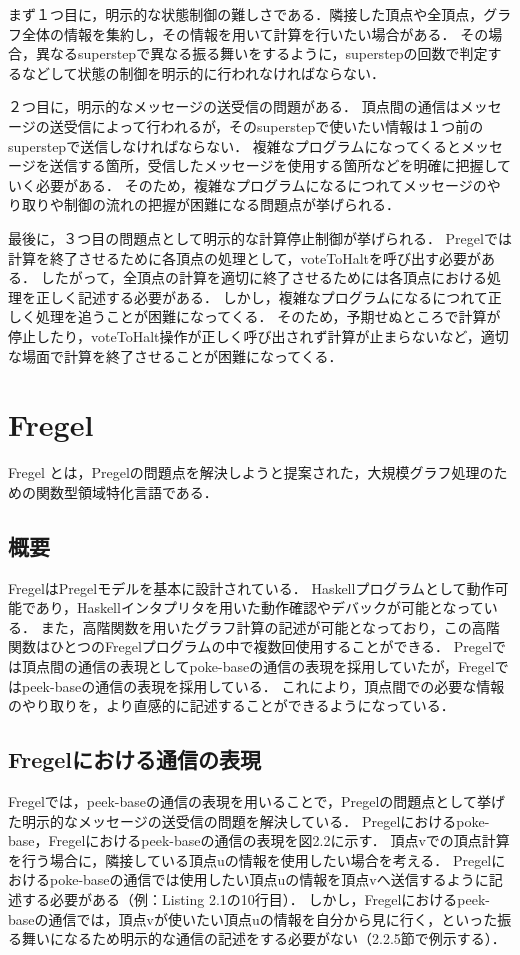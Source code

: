 \documentclass[12pt]{ujreport}
\begin{document}
まず１つ目に，明示的な状態制御の難しさである．隣接した頂点や全頂点，グラフ全体の情報を集約し，その情報を用いて計算を行いたい場合がある．
その場合，異なるsuperstepで異なる振る舞いをするように，superstepの回数で判定するなどして状態の制御を明示的に行われなければならない．

２つ目に，明示的なメッセージの送受信の問題がある．
頂点間の通信はメッセージの送受信によって行われるが，そのsuperstepで使いたい情報は１つ前のsuperstepで送信しなければならない．
複雑なプログラムになってくるとメッセージを送信する箇所，受信したメッセージを使用する箇所などを明確に把握していく必要がある．
そのため，複雑なプログラムになるにつれてメッセージのやり取りや制御の流れの把握が困難になる問題点が挙げられる．

最後に，３つ目の問題点として明示的な計算停止制御が挙げられる．
Pregelでは計算を終了させるために各頂点の処理として，voteToHaltを呼び出す必要がある．
したがって，全頂点の計算を適切に終了させるためには各頂点における処理を正しく記述する必要がある．
しかし，複雑なプログラムになるにつれて正しく処理を追うことが困難になってくる．
そのため，予期せぬところで計算が停止したり，voteToHalt操作が正しく呼び出されず計算が止まらないなど，適切な場面で計算を終了させることが困難になってくる．

\section{Fregel}
Fregel \cite{fregel}とは，Pregelの問題点を解決しようと提案された，大規模グラフ処理のための関数型領域特化言語である．

\subsection{概要}
FregelはPregelモデルを基本に設計されている．
Haskellプログラムとして動作可能であり，Haskellインタプリタを用いた動作確認やデバックが可能となっている．
また，高階関数を用いたグラフ計算の記述が可能となっており，この高階関数はひとつのFregelプログラムの中で複数回使用することができる．
Pregelでは頂点間の通信の表現としてpoke-baseの通信の表現を採用していたが，Fregelではpeek-baseの通信の表現を採用している．
これにより，頂点間での必要な情報のやり取りを，より直感的に記述することができるようになっている．

\subsection{Fregelにおける通信の表現}
Fregelでは，peek-baseの通信の表現を用いることで，Pregelの問題点として挙げた明示的なメッセージの送受信の問題を解決している．
Pregelにおけるpoke-base，Fregelにおけるpeek-baseの通信の表現を図2.2に示す．
頂点vでの頂点計算を行う場合に，隣接している頂点uの情報を使用したい場合を考える．
Pregelにおけるpoke-baseの通信では使用したい頂点uの情報を頂点vへ送信するように記述する必要がある（例：Listing 2.1の10行目）．
しかし，Fregelにおけるpeek-baseの通信では，頂点vが使いたい頂点uの情報を自分から見に行く，といった振る舞いになるため明示的な通信の記述をする必要がない（2.2.5節で例示する）．
\end{document}
